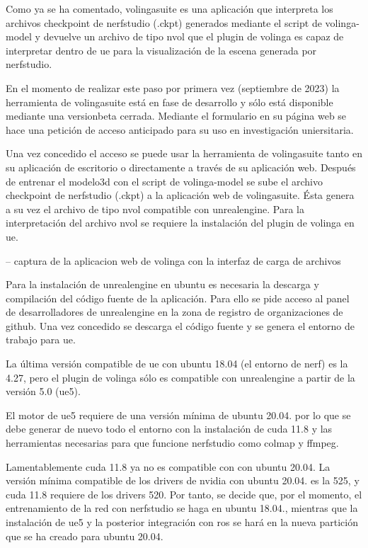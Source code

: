 \documentclass[a4paper, 12pt, spanish, twoside]{article}
\begin{document}
Como ya se ha comentado, \gls{volingasuite} es una aplicación que interpreta los archivos checkpoint de \gls{nerfstudio} (.ckpt) generados mediante el script de \gls{volinga-model} y devuelve un archivo de tipo \gls{nvol} que el \gls{plugin} de \gls{volinga} es capaz de interpretar dentro de \acrshort{ue} para la visualización de la escena generada por \gls{nerfstudio}. 

En el momento de realizar este paso por primera vez (septiembre de 2023) la herramienta de \gls{volingasuite} está en fase de desarrollo y sólo está disponible mediante una \gls{versionbeta} cerrada. Mediante el formulario en su página web se hace una petición de acceso anticipado para su uso en investigación uniersitaria.  

Una vez concedido el acceso se puede usar la herramienta de \gls{volingasuite} tanto en su aplicación de escritorio o directamente a través de su aplicación web. Después de entrenar el \gls{modelo3d} con el script de \gls{volinga-model} se sube el archivo checkpoint de \gls{nerfstudio} (.ckpt) a la aplicación web de \gls{volingasuite}. Ésta genera a su vez el archivo de tipo \gls{nvol} compatible con \gls{unrealengine}. Para la interpretación del archivo \gls{nvol} se requiere la instalación del \gls{plugin} de \gls{volinga} en \acrshort{ue}. 

-- captura de la aplicacion web de volinga con la interfaz de carga de archivos  

Para la instalación de \gls{unrealengine} en \gls{ubuntu} es necesaria la descarga y compilación del código fuente de la aplicación. Para ello se pide acceso al panel de desarrolladores de \gls{unrealengine} en la zona de registro de organizaciones de \gls{github}. Una vez concedido se descarga el código fuente y se genera el entorno de trabajo para \acrshort{ue}. 

La última versión compatible de \acrshort{ue} con \gls{ubuntu} 18.04 (el entorno de \acrshort{nerf}) es la 4.27, pero el \gls{plugin} de \gls{volinga} sólo es compatible con \gls{unrealengine} a partir de la versión 5.0 (\acrshort{ue}5). 

El motor de \acrshort{ue}5 requiere de una versión mínima de \gls{ubuntu} 20.04. por lo que se debe generar de nuevo todo el entorno con la instalación de \acrshort{cuda} 11.8 y las herramientas necesarias para que funcione \gls{nerfstudio} como \gls{colmap} y \gls{ffmpeg}. 

Lamentablemente \acrshort{cuda} 11.8 ya no es compatible con con \gls{ubuntu} 20.04. La versión mínima compatible de los drivers de \gls{nvidia} con \gls{ubuntu} 20.04. es la 525, y \acrshort{cuda} 11.8 requiere de los drivers 520. Por tanto, se decide que, por el momento, el entrenamiento de la red con \gls{nerfstudio} se haga en \gls{ubuntu} 18.04., mientras que la instalación de \acrshort{ue}5 y la posterior integración con \acrshort{ros} se hará en la nueva partición que se ha creado para \gls{ubuntu} 20.04. 
\end{document}
